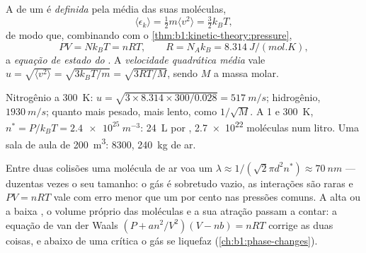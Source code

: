 \begin{definition}\label{def:b1:kinetic-theory:kinetictemp}
A  de um  é \emph{definida} pela 
média das suas moléculas,
\[
\langle\epsilon_k\rangle = \tfrac12 m\langle v^2\rangle = \tfrac32 k_BT ,
\]
de modo que, combinando com o \cref{thm:b1:kinetic-theory:pressure},
\[
PV = Nk_BT = nRT, \qquad R = N_Ak_B = \qty{8.314}{J/(mol.K)} ,
\]
a \emph{equação de estado do }. A \emph{velocidade quadrática
média} vale $u = \sqrt{\langle v^2\rangle} = \sqrt{3k_BT/m} = \sqrt{3RT/M}$,
sendo $M$ a massa molar.
\end{definition}

\begin{example}\label{ex:b1:kinetic-theory:air}
Nitrogênio a \qty{300}{K}: $u = \sqrt{3 \times 8.314 \times 300/0.028} =
\qty{517}{m/s}$; hidrogênio, $\qty{1930}{m/s}$; quanto mais pesado, mais lento, como
$1/\sqrt M$. A \qty{1}{} e \qty{300}{K}, $n^* = P/k_BT = \qty{2.4e25}{m^{-3}}$:
\qty{24}{L} por , \qty{2.7e22}{} moléculas num litro. Uma sala de aula de
\qty{200}{m^3}: \qty{8300}{}, \qty{240}{kg} de ar.
\end{example}

\begin{remark}\label{rem:b1:kinetic-theory:validity}
Entre duas colisões uma molécula de ar voa um \emph{}
$\lambda \approx 1/(\sqrt2\pi d^2n^*) \approx \qty{70}{nm}$ --- duzentas
vezes o seu tamanho: o gás é sobretudo vazio, as interações são raras e
$PV = nRT$ vale com erro menor que um por cento nas pressões comuns. A alta
 ou a baixa , o volume próprio das moléculas e a sua
atração passam a contar: a equação de van der Waals $(P + an^2/V^2)(V - nb) = nRT$
corrige as duas coisas, e abaixo de uma  crítica o gás se liquefaz
(\cref{ch:b1:phase-changes}).
\end{remark}

